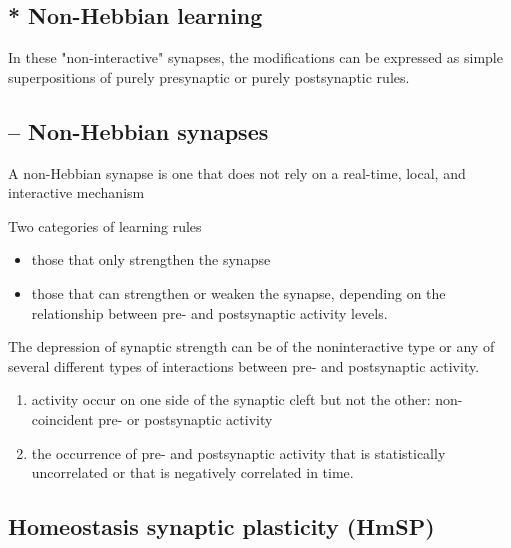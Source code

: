 \subsection{ * Non-Hebbian learning}
\label{sec:non-Hebbian-learning}

In these "non-interactive" synapses, the modifications can be expressed as
simple superpositions of purely presynaptic or purely postsynaptic rules.

\subsection{ -- Non-Hebbian synapses}
\label{sec:non-Hebbian-synapse}

A non-Hebbian synapse is one that does not rely on a real-time, local, and
interactive mechanism

Two categories of learning rules
\begin{itemize}
  \item those that only strengthen the synapse
  
  \item those that can strengthen or weaken the synapse, depending on the
  relationship between pre- and postsynaptic activity levels.
  
\end{itemize}

The depression of synaptic strength can be of the noninteractive type or any of
several different types of interactions between pre- and postsynaptic activity.
\begin{enumerate}
  \item activity occur on one side of the synaptic cleft but not
  the other: non-coincident pre- or postsynaptic activity
  
  \item the occurrence of pre- and postsynaptic activity that is statistically
  uncorrelated or that is negatively correlated in time.
\end{enumerate} 








\subsection{Homeostasis synaptic plasticity (HmSP)}
\label{sec:HmSP}
\label{sec:homeostatic-synaptic-plasticity}

